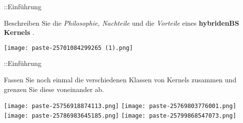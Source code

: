 \documentclass{article}
\begin{document}
\begin{tcolorbox}[colback=white!10!white,colframe=lightgray!75!black,
  savelowerto=\jobname_ex.tex]

\begin{center}
::Einführung

\end{center}

\tcblower

\justifying

\end{tcolorbox}
\begin{tcolorbox}[colback=white!10!white,colframe=lightgray!75!black,
  savelowerto=\jobname_ex.tex]

\begin{center}
Beschreiben Sie die
\textit{Philosophie, Nachteile
}und die
\textit{Vorteile
}eines 
\textbf{hybridenBS Kernels
}.

\end{center}

\tcblower

\justifying
\texttt{[image: paste-25701084299265 (1).png]}

\end{tcolorbox}
\begin{tcolorbox}[colback=white!10!white,colframe=lightgray!75!black,
  savelowerto=\jobname_ex.tex]

\begin{center}
::Einführung

\end{center}

\tcblower

\justifying

\end{tcolorbox}
\begin{tcolorbox}[colback=white!10!white,colframe=lightgray!75!black,
  savelowerto=\jobname_ex.tex]

\begin{center}
Fassen Sie noch einmal die verschiedenen Klassen von Kernels zusammen und grenzen Sie diese voneinander ab.

\end{center}

\tcblower

\justifying
\texttt{[image: paste-25756918874113.png]}
\texttt{[image: paste-25769803776001.png]}
\texttt{[image: paste-25786983645185.png]}
\texttt{[image: paste-25799868547073.png]}

\end{tcolorbox}
\end{document}
